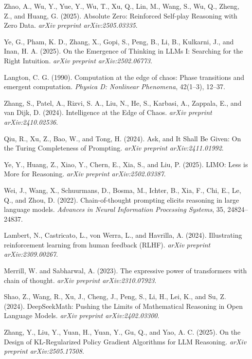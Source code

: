 \documentclass[10pt,a4paper]{article}
\begin{document}
\begin{thebibliography}{10}

Zhao, A., Wu, Y., Yue, Y., Wu, T., Xu, Q., Lin, M., Wang, S., Wu, Q., Zheng, Z., and Huang, G. (2025). Absolute Zero: Reinforced Self-play Reasoning with Zero Data. \textit{arXiv preprint arXiv:2505.03335}.

Ye, G., Pham, K. D., Zhang, X., Gopi, S., Peng, B., Li, B., Kulkarni, J., and Inan, H. A. (2025). On the Emergence of Thinking in LLMs I: Searching for the Right Intuition. \textit{arXiv preprint arXiv:2502.06773}.

Langton, C. G. (1990). Computation at the edge of chaos: Phase transitions and emergent computation. \textit{Physica D: Nonlinear Phenomena}, 42(1--3), 12--37.

Zhang, S., Patel, A., Rizvi, S. A., Liu, N., He, S., Karbasi, A., Zappala, E., and van Dijk, D. (2024). Intelligence at the Edge of Chaos. \textit{arXiv preprint arXiv:2410.02536}.

Qiu, R., Xu, Z., Bao, W., and Tong, H. (2024). Ask, and It Shall Be Given: On the Turing Completeness of Prompting. \textit{arXiv preprint arXiv:2411.01992}.

Ye, Y., Huang, Z., Xiao, Y., Chern, E., Xia, S., and Liu, P. (2025). LIMO: Less is More for Reasoning. \textit{arXiv preprint arXiv:2502.03387}.

Wei, J., Wang, X., Schuurmans, D., Bosma, M., Ichter, B., Xia, F., Chi, E., Le, Q., and Zhou, D. (2022). Chain-of-thought prompting elicits reasoning in large language models. \textit{Advances in Neural Information Processing Systems}, 35, 24824--24837.

Lambert, N., Castricato, L., von Werra, L., and Havrilla, A. (2024). Illustrating reinforcement learning from human feedback (RLHF). \textit{arXiv preprint arXiv:2309.00267}.

Merrill, W. and Sabharwal, A. (2023). The expressive power of transformers with chain of thought. \textit{arXiv preprint arXiv:2310.07923}.

Shao, Z., Wang, R., Xu, J., Cheng, J., Peng, S., Li, H., Lei, K., and Su, Z. (2024). DeepSeekMath: Pushing the Limits of Mathematical Reasoning in Open Language Models. \textit{arXiv preprint arXiv:2402.03300}.

Zhang, Y., Liu, Y., Yuan, H., Yuan, Y., Gu, Q., and Yao, A. C. (2025). On the Design of KL-Regularized Policy Gradient Algorithms for LLM Reasoning. \textit{arXiv preprint arXiv:2505.17508}.

\end{thebibliography}
\end{document}

